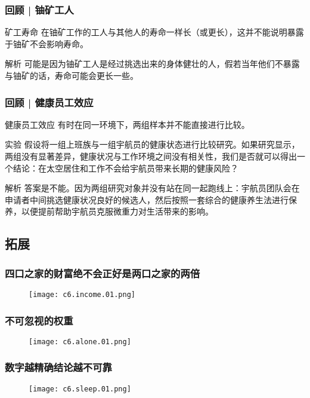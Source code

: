 \begin{frame}
  \frametitle{回顾 | 铀矿工人}
  \begin{block}{矿工寿命}
    在铀矿工作的工人与其他人的寿命一样长（或更长），这并不能说明暴露于铀矿不会影响寿命。
  \end{block}
  \pause
  \begin{block}{解析}
    可能是因为铀矿工人是经过挑选出来的身体健壮的人，假若当年他们不暴露与铀矿的话，寿命可能会更长一些。
  \end{block}
\end{frame}

\begin{frame}
  \frametitle{回顾 | 健康员工效应}
  \begin{block}{健康员工效应}
    有时在同一环境下，两组样本并不能直接进行比较。
  \end{block}
  \pause
  \begin{block}{实验}
假设将一组上班族与一组宇航员的健康状态进行比较研究。如果研究显示，两组没有显著差异，健康状况与工作环境之间没有相关性，我们是否就可以得出一个结论：在太空居住和工作不会给宇航员带来长期的健康风险？
  \end{block}
  \pause
  \begin{block}{解析}
答案是不能。因为两组研究对象并没有站在同一起跑线上：宇航员团队会在申请者中间挑选健康状况良好的候选人，然后按照一套综合的健康养生法进行保养，以便提前帮助宇航员克服微重力对生活带来的影响。
  \end{block}
\end{frame}

\subsection{拓展}
\begin{frame}
  \frametitle{四口之家的财富绝不会正好是两口之家的两倍}
  \begin{figure}
    \centering
    \texttt{[image: c6.income.01.png]}
  \end{figure}
\end{frame}

\begin{frame}
  \frametitle{不可忽视的权重}
  \begin{figure}
    \centering
    \texttt{[image: c6.alone.01.png]}
  \end{figure}
\end{frame}

\begin{frame}
  \frametitle{数字越精确结论越不可靠}
  \begin{figure}
    \centering
    \texttt{[image: c6.sleep.01.png]}
  \end{figure}
\end{frame}

